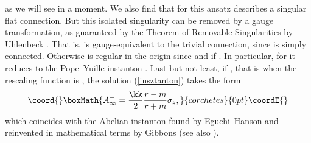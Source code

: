 \documentclass[a4paper,12pt,draft]{article}
\begin{document}
as we will see in a moment. We also find that for \coordHE{} this
ansatz describes a singular flat connection. But this
isolated singularity can be removed by a gauge transformation, as
guaranteed by the Theorem of Removable Singularities by Uhlenbeck
\cite{uhl}. That is, \coordHE{} is gauge-equivalent to
the trivial connection, since  \coordHE{} is simply connected. Otherwise
\coordHE{} is regular in the origin since \coordHE{} and
\coordHE{} if \coordHE{}. In particular, for \coordHE{} it reduces
to the Pope--Yuille instanton \cite{pop-yui}. Last but not least, if
\myHighlight{$\lambda =\infty$}\coordHE{}, that is when the rescaling function is \coordHE{}, the
solution (\ref{insztanton}) takes the form
\[\coord{}\boxMath{A^-_\infty ={\kk\over 2}{r-m\over r+m}\sigma_z,}{corchetes}{0pt}\coordE{}\]
which coincides with the Abelian instanton found
by Eguchi--Hanson \cite{egu-han} and reinvented in
mathematical terms by Gibbons \cite{gib} (see also \cite{pop}).
\end{document}
